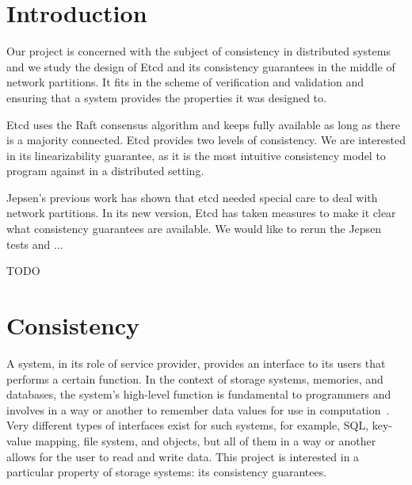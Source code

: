 \documentclass[12pt,conference]{IEEEtran}
\begin{document}




%
\IEEEpeerreviewmaketitle



\section{Introduction}

Our project is concerned with the subject of consistency in distributed systems and we study the design of Etcd and its consistency guarantees in the middle of network partitions. It fits in the scheme of verification and validation and ensuring that a system provides the properties it was designed to.

Etcd uses the Raft consensus algorithm and keeps fully available as long as there is a majority connected. Etcd provides two levels of consistency. We are interested in its linearizability guarantee, as it is the most intuitive consistency model to program against in a distributed setting.

Jepsen’s previous work has shown that etcd needed special care to deal with network partitions. In its new version, Etcd has taken measures to make it clear what consistency guarantees are available. We would like to rerun the Jepsen tests and ...

TODO


\section{Consistency}

A system, in its role of service provider, provides an interface to its users that performs a certain function. In the context of storage systems, memories, and databases, the system’s high-level function is fundamental to programmers and involves in a way or another to remember data values for use in computation~\cite{saltzer2009principles}. Very different types of interfaces exist for such systems, for example, SQL, key-value mapping, file system, and objects, but all of them in a way or another allows for the user to read and write data. This project is interested in a particular property of storage systems: its consistency guarantees.
\end{document}
